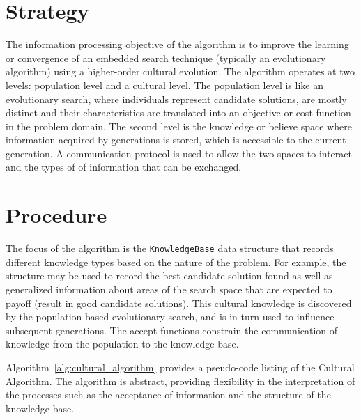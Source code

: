 \documentclass[a4paper, 11pt]{article}
\begin{document}
\section{Strategy}
\label{sec:strategy}
The information processing objective of the algorithm is to improve the learning or convergence of an embedded search technique (typically an evolutionary algorithm) using a higher-order cultural evolution. 
The algorithm operates at two levels: population level and a cultural level. The population level is like an evolutionary search, where individuals represent candidate solutions, are mostly distinct and their characteristics are translated into an objective or cost function in the problem domain. The second level is the knowledge or believe space where information acquired by generations  is stored, which is accessible to the current generation. A communication protocol is used to allow the two spaces to interact and the types of of information that can be exchanged. 

\section{Procedure}
\label{sec:procedure}
The focus of the algorithm is the \texttt{KnowledgeBase} data structure that records different knowledge types based on the nature of the problem. For example, the structure may be used to record the best candidate solution found as well as generalized information about areas of the search space that are expected to payoff (result in good candidate solutions). This cultural knowledge is discovered by the population-based evolutionary search, and is in turn used to influence subsequent generations. The accept functions constrain the communication of knowledge from the population to the knowledge base.

Algorithm~\ref{alg:cultural_algorithm} provides a pseudo-code listing of the Cultural Algorithm. The algorithm is abstract, providing flexibility in the interpretation of the processes such as the acceptance of information and the structure of the knowledge base.
\end{document}
